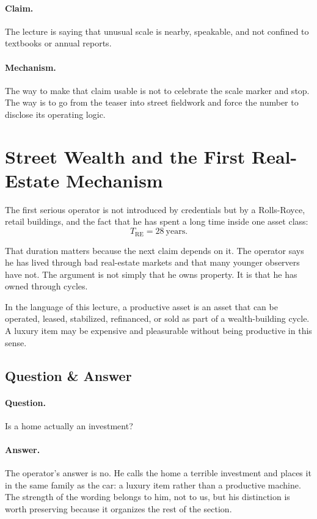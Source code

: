 \paragraph{Claim.}
The lecture is saying that unusual scale is nearby, speakable, and not confined to textbooks or annual reports.

\paragraph{Mechanism.}
The way to make that claim usable is not to celebrate the scale marker and stop. The way is to go from the teaser into street fieldwork and force the number to disclose its operating logic.

\section{Street Wealth and the First Real-Estate Mechanism}

The first serious operator is not introduced by credentials but by a Rolls-Royce, retail buildings, and the fact that he has spent a long time inside one asset class:
\begin{equation}
T_{\mathrm{RE}} = 28\ \text{years}.
\end{equation}

That duration matters because the next claim depends on it. The operator says he has lived through bad real-estate markets and that many younger observers have not. The argument is not simply that he owns property. It is that he has owned through cycles.

\begin{definition}
In the language of this lecture, a productive asset is an asset that can be operated, leased, stabilized, refinanced, or sold as part of a wealth-building cycle. A luxury item may be expensive and pleasurable without being productive in this sense.
\end{definition}

\subsection{Question \& Answer}

\paragraph{Question.}
Is a home actually an investment?

\paragraph{Answer.}
The operator's answer is no. He calls the home a terrible investment and places it in the same family as the car: a luxury item rather than a productive machine. The strength of the wording belongs to him, not to us, but his distinction is worth preserving because it organizes the rest of the section.

